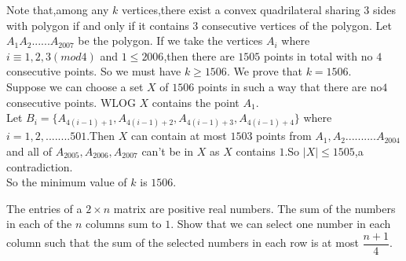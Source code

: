 \documentclass{subfile}
\begin{document}
	\begin{solution}  Note that,among any $k$ vertices,there exist a convex quadrilateral sharing 3 sides with polygon if and only if it contains $3$ consecutive vertices of the polygon. Let $A_1A_2......A_{2007}$ be the polygon. If we take the vertices $A_i$ where $i\equiv 1,2,3(mod 4)$ and $1\leq 2006$,then there are $1505$ points in total with no $4$ consecutive points. So we must have $k\geq 1506$. We prove that $k=1506$.\\
		Suppose we can choose a set $X$ of $1506$ points in such a way that there are no$4$ consecutive points. WLOG $X$ contains the point $A_1$.\\
		Let $B_i=\{A_{4(i-1)+1},A_{4(i-1)+2},A_{4(i-1)+3},A_{4(i-1)+4}\}$ where $i=1,2,........501$.Then $X$ can contain at most $1503$ points from $A_1,A_2..........A_{2004}$ and all of $A_{2005},A_{2006},A_{2007}$ can't be in $X$ as $X$ contains $1$.So $|X|\leq 1505$,a contradiction.\\
		
		So the minimum value of $k$ is $1506$.
	\end{solution}
	
	\begin{problem}
		The entries of a $2 \times n$ matrix are positive real numbers. The sum of the numbers in each of the $n$ columns sum to $1$. Show that we can select one number in each column such that the sum of the selected numbers in each row is at most $\dfrac{n+1}{4}$.
	\end{problem}
	
\end{document}
